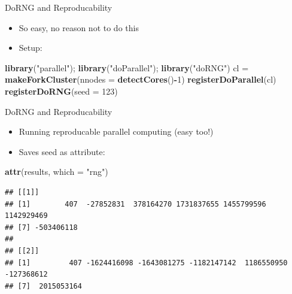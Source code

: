 \documentclass[ignorenonframetext,]{beamer}
\newenvironment{Shaded}{\begin{snugshade}}{\end{snugshade}}
\newcommand{\DataTypeTok}[1]{\textcolor[rgb]{0.13,0.29,0.53}{#1}}
\newcommand{\DecValTok}[1]{\textcolor[rgb]{0.00,0.00,0.81}{#1}}
\newcommand{\KeywordTok}[1]{\textcolor[rgb]{0.13,0.29,0.53}{\textbf{#1}}}
\newcommand{\NormalTok}[1]{#1}
\newcommand{\OperatorTok}[1]{\textcolor[rgb]{0.81,0.36,0.00}{\textbf{#1}}}
\newcommand{\StringTok}[1]{\textcolor[rgb]{0.31,0.60,0.02}{#1}}
\providecommand{\tightlist}{%
  \setlength{\itemsep}{0pt}\setlength{\parskip}{0pt}}
\begin{document}
\begin{frame}[fragile]{DoRNG and Reproducability}
\protect\hypertarget{dorng-and-reproducability-2}{}

\begin{itemize}
\item
  So easy, no reason not to do this
\item
  Setup:
\end{itemize}

\begin{Shaded}
\begin{Highlighting}[]
\KeywordTok{library}\NormalTok{(}\StringTok{"parallel"}\NormalTok{); }\KeywordTok{library}\NormalTok{(}\StringTok{"doParallel"}\NormalTok{); }\KeywordTok{library}\NormalTok{(}\StringTok{"doRNG"}\NormalTok{)}
\NormalTok{cl =}\StringTok{ }\KeywordTok{makeForkCluster}\NormalTok{(}\DataTypeTok{nnodes =} \KeywordTok{detectCores}\NormalTok{()}\OperatorTok{-}\DecValTok{1}\NormalTok{)}
\KeywordTok{registerDoParallel}\NormalTok{(cl)}
\KeywordTok{registerDoRNG}\NormalTok{(}\DataTypeTok{seed =} \DecValTok{123}\NormalTok{)}
\end{Highlighting}
\end{Shaded}

\end{frame}

\begin{frame}[fragile]{DoRNG and Reproducability}
\protect\hypertarget{dorng-and-reproducability-3}{}

\begin{itemize}
\tightlist
\item
  Running reproducable parallel computing (easy too!)
\end{itemize}

\begin{Shaded}
\end{Shaded}

\begin{itemize}
\tightlist
\item
  Saves seed as attribute:
\end{itemize}

\begin{Shaded}
\begin{Highlighting}[]
\KeywordTok{attr}\NormalTok{(results, }\DataTypeTok{which =} \StringTok{"rng"}\NormalTok{)}
\end{Highlighting}
\end{Shaded}

\begin{verbatim}
## [[1]]
## [1]        407  -27852831  378164270 1731837655 1455799596 1142929469
## [7] -503406118
## 
## [[2]]
## [1]         407 -1624416098 -1643081275 -1182147142  1186550950  -127368612
## [7]  2015053164
\end{verbatim}

\end{frame}
\end{document}
